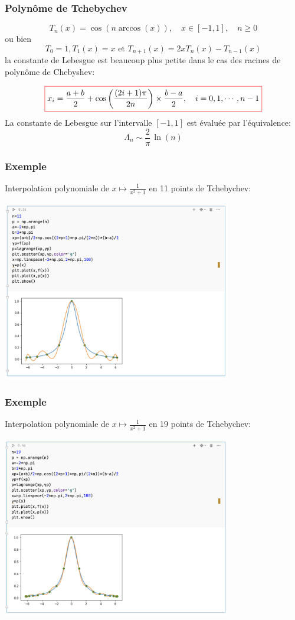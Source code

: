 \documentclass{beamer}
\newcommand{\myredbox}[1]{\fcolorbox{red}{white}{$\displaystyle#1$}}
\begin{document}
 \begin{frame}
  \frametitle{Polynôme de Tchebychev}
\[T_n(x) = \cos(n \arccos(x)),\quad x \in [-1, 1],\quad n\geq0\]
ou bien  \[T_0 =  1 , T_1(x) = x \mbox{ et } T_{n+1}(x) = 2 x T_n(x)-T_{n-1}(x)\] 
la constante de Lebesgue est beaucoup plus petite dans le cas des racines de polynôme de
Chebyshev:

\[\myredbox{x_i = \frac{a+b}2 + \cos\left(\frac{(2i + 1)\pi}
{2n}\right)\times \frac{b-a}{2},\quad i=0,1,\cdots , n-1}\]
La constante de Lebesgue sur l'intervalle $[-1, 1]$ est évaluée par l'équivalence:
\[\Lambda_n \sim \frac{2}{\pi}\, \ln(n)\]


\end{frame}

 \begin{frame}
 \frametitle{Exemple}
 Interpolation polynomiale de $x\mapsto \frac 1{x^2+1}$ en 11 points de Tchebychev:
\begin{center}
\includegraphics[width=10cm]{images/interpolationDeLagrange06.png}
\end{center}
\end{frame}

 \begin{frame}
 \frametitle{Exemple}
 Interpolation polynomiale de $x\mapsto \frac 1{x^2+1}$ en 19 points de Tchebychev:
\begin{center}
\includegraphics[width=10cm]{images/interpolationDeLagrange07.png}
\end{center}
\end{frame}
\end{document}
